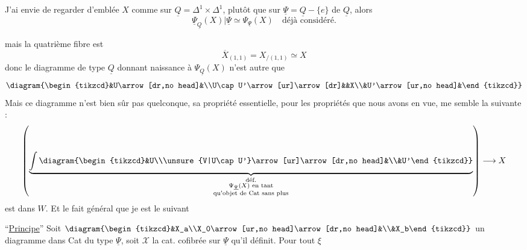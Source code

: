 J'ai envie de regarder d'emblée $X$ comme sur $\underline Q=\Delta^1\times\Delta^1$, plutôt que sur  $\underline\Psi=\underline Q-\{e\}$ de $\underline Q$, alors
\[\underline\Psi_{\underline Q}(X)|\underline\Psi\simeq\Psi_{\underline\Psi}(X)\quad\text{déjà considéré.}\]

mais la quatrième fibre est
\[\overline X_{(1,1)}=X_{/(1,1)}\simeq X\]
donc le diagramme  de type $\underline Q$ donnant naissance à $\Psi_{\underline Q}(X)$ n'est autre que
\[\diagram{\begin{tikzcd}&U\arrow[dr,no head]&\\U\cap U'\arrow[ur]\arrow[dr]&&X\\&U'\arrow[ur,no head]&\end{tikzcd}}\]
Mais ce diagramme  n'est bien sûr pas quelconque, sa propriété essentielle, pour les propriétés que nous avons en vue, me semble la suivante :
\[\left(\underbrace{\int\diagram{\begin{tikzcd}&U\\\unsure{V|U\cap U'}\arrow[ur]\arrow[dr,no head]&\\&U'\end{tikzcd}}}_{\substack{\text{déf.}\\\Psi_{\underline\Psi}(X)\text{ en tant}\\\text{qu'objet de Cat sans plus}}}\right)\longrightarrow X\]
est dans $W$. Et le fait général que je  est le suivant

``\uline{Principe}''  Soit $\diagram{\begin{tikzcd}&X_a\\X_0\arrow[ur,no head]\arrow[dr,no head]&\\&X_b\end{tikzcd}}$ un diagramme dans Cat du type $\underline\Psi$, soit $\mathcal X$ la cat. cofibrée sur $\underline\Psi$ qu'il définit. Pour tout $\xi$

